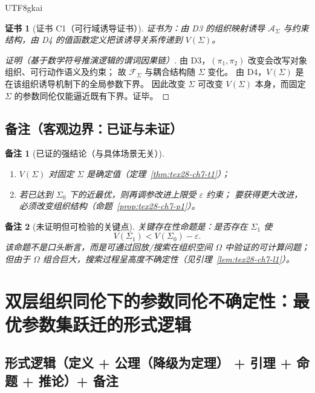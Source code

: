 \documentclass[12pt]{article}
\newtheorem{remark}{备注}[section]
\newtheorem{Certificate}{证书}[section]
\begin{document}
\begin{CJK*}{UTF8}{gkai}
\begin{Certificate}[证书 C1（可行域诱导证书）]
\label{cert:tex28-ch7-c1}
证书为：由 D3 的组织映射诱导 $\mathcal{A}_{\Sigma}$ 与约束结构，由 D4 的值函数定义把该诱导关系传递到 $V(\Sigma)$。
\end{Certificate}

\begin{proof}[证明（基于数学符号推演逻辑的谓词因果链）]
由 D3，$(\pi_1,\pi_2)$ 改变会改写对象组织、可行动作语义及约束；
故 $\mathcal{F}_{\Sigma}$ 与耦合结构随 $\Sigma$ 变化。
由 D4，$V(\Sigma)$ 是在该组织诱导机制下的全局参数下界。
因此改变 $\Sigma$ 可改变 $V(\Sigma)$ 本身，而固定 $\Sigma$ 的参数同伦仅能逼近既有下界。证毕。
\end{proof}

\subsection{备注（客观边界：已证与未证）}
\label{subsec:tex28-ch7-remarks}

\begin{remark}[已证的强结论（与具体场景无关）]
\begin{enumerate}
  \item $V(\Sigma)$ 对固定 $\Sigma$ 是确定值（定理~\ref{thm:tex28-ch7-t1}）；
  \item 若已达到 $\Sigma_0$ 下的近最优，则再调参改进上限受 $\varepsilon$ 约束；
  要获得更大改进，必须改变组织结构（命题~\ref{prop:tex28-ch7-p1}）。
\end{enumerate}
\end{remark}

\begin{remark}[未证明但可检验的关键点]
关键存在性命题是：是否存在 $\Sigma_1$ 使
\[
  V(\Sigma_1)<V(\Sigma_0)-\varepsilon.
\]
该命题不是口头断言，而是可通过回放/搜索在组织空间 $\Omega$ 中验证的可计算问题；
但由于 $\Omega$ 组合巨大，搜索过程呈高度不确定性（见引理~\ref{lem:tex28-ch7-l1}）。
\end{remark}

\clearpage

\section{双层组织同伦下的参数同伦不确定性：最优参数集跃迁的形式逻辑}
\label{sec:tex28-ch8}

\subsection{形式逻辑（定义 + 公理（降级为定理） + 引理 + 命题 + 推论）+ 备注}
\label{subsec:tex28-ch8-logic-structure}


\end{CJK*}
\end{document}
